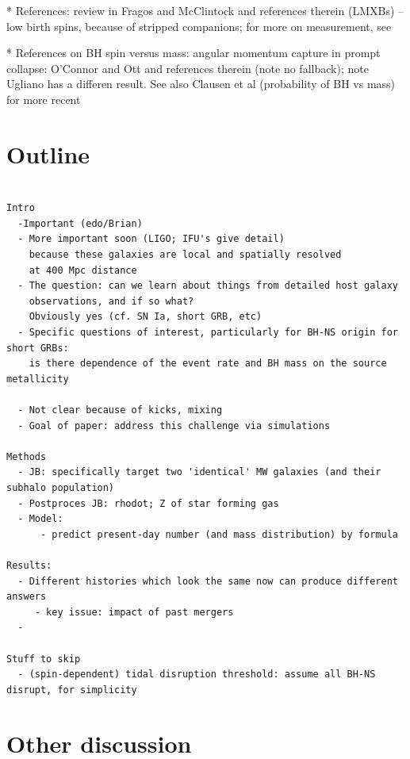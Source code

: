 \documentclass[nofootinbib,twocolumn,prd]{emulateapj}
\begin{document}
* References: review in Fragos and McClintock \cite{2015ApJ...800...17F}  and references therein (LMXBs) -- low birth
spins, because of stripped companions; for more on measurement, see \cite{2011CQGra..28k4009M}


* References on BH spin versus mass: angular momentum capture in prompt collapse: O'Connor and Ott and references
therein (note no fallback); note Ugliano has a differen result. See also Clausen et
al (probability of BH vs mass) for more recent


\section{Outline }
\begin{verbatim}

Intro
  -Important (edo/Brian)
  - More important soon (LIGO; IFU's give detail)
    because these galaxies are local and spatially resolved
    at 400 Mpc distance
  - The question: can we learn about things from detailed host galaxy 
    observations, and if so what?
    Obviously yes (cf. SN Ia, short GRB, etc)
  - Specific questions of interest, particularly for BH-NS origin for short GRBs:
    is there dependence of the event rate and BH mass on the source metallicity

  - Not clear because of kicks, mixing
  - Goal of paper: address this challenge via simulations

Methods
  - JB: specifically target two 'identical' MW galaxies (and their subhalo population)
  - Postproces JB: rhodot; Z of star forming gas
  - Model:
      - predict present-day number (and mass distribution) by formula 

Results:
  - Different histories which look the same now can produce different answers
     - key issue: impact of past mergers
  - 

Stuff to skip
  - (spin-dependent) tidal disruption threshold: assume all BH-NS disrupt, for simplicity
\end{verbatim}


\section{Other discussion}
\end{document}
